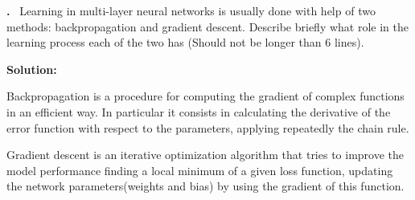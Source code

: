 \documentclass[a4paper,12pt]{article} %
\newcounter{problem}
\newcounter{solution}
\newcommand\Problem{%
	\stepcounter{problem}%
	\textbf{\theproblem.}~%
	\setcounter{solution}{0}%
}
\newcommand\Solution{%
	\textbf{Solution:}\\%
}
\begin{document}
	\Problem{Learning in multi-layer neural networks is usually done with help 
	of two methods: backpropagation and gradient descent. Describe briefly 
	what role in the learning process each of the two has (Should not be longer 
	than $6$ lines).}\medskip
	
	\Solution{Backpropagation is a procedure for computing the gradient of 
	complex functions in an efficient way. In particular it consists in 
	calculating the derivative of the error function with respect to the 
	parameters, applying repeatedly the chain rule.\medskip
	
	Gradient descent is an iterative optimization algorithm that tries to 
	improve the model performance finding a local minimum of a given loss 
	function, updating the network parameters(weights and bias) by using the 
	gradient of this function. }
\end{document}
